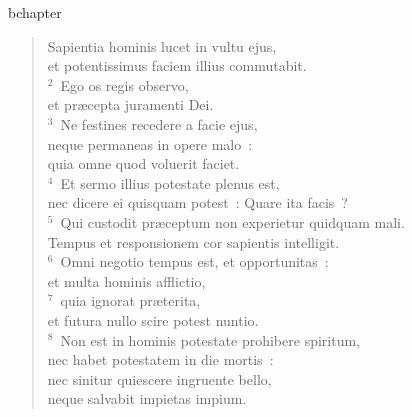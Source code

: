 bchapter\begin{verse}\vspace{-19pt}Sapientia hominis lucet in vultu ejus,\\ et potentissimus faciem illius commutabit.\\
${}^{2}$~Ego os regis observo,\\ et pr\ae cepta juramenti Dei.\\
${}^{3}$~Ne festines recedere a facie ejus,\\ neque permaneas in opere malo~:\\ quia omne quod voluerit faciet.\\
${}^{4}$~Et sermo illius potestate plenus est,\\ nec dicere ei quisquam potest~: Quare ita facis~?\\
${}^{5}$~Qui custodit pr\ae ceptum non experietur quidquam mali.\\ Tempus et responsionem cor sapientis intelligit.\\
${}^{6}$~Omni negotio tempus est, et opportunitas~:\\ et multa hominis afflictio,\\
${}^{7}$~quia ignorat pr\ae terita,\\ et futura nullo scire potest nuntio.\\
${}^{8}$~Non est in hominis potestate prohibere spiritum,\\ nec habet potestatem in die mortis~:\\ nec sinitur quiescere ingruente bello,\\ neque salvabit impietas impium.\end{verse}


